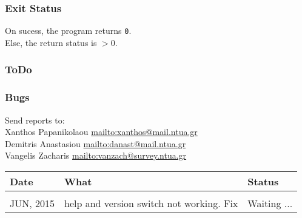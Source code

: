 \subsubsection{Exit Status}
On sucess, the program returns \texttt{0}.\\
Else, the return status is $>$0.

\subsubsection{ToDo}

\subsubsection{Bugs}
Send reports to:\\
Xanthos Papanikolaou \href{mailto:xanthos@mail.ntua.gr}{mailto:xanthos@mail.ntua.gr}\\
Demitris Anastasiou  \href{mailto:danast@mail.ntua.gr}{mailto:danast@mail.ntua.gr}\\
Vangelis Zacharis  \href{mailto:vanzach@survey.ntua.gr}{mailto:vanzach@survey.ntua.gr}\\
\bigskip

\begin{tabular}{l l l}
Date & What & Status\\
\hline \\
JUN, 2015 & help and version switch not working. Fix & Waiting ...\\
\end{tabular}